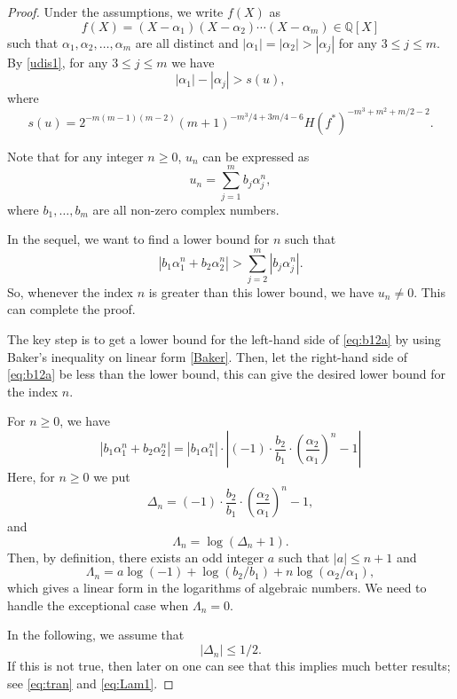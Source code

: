 \documentclass[12pt]{amsart}
\theoremstyle{definition}
\theoremstyle{remark}
\numberwithin{equation}{section}
\begin{document}
\begin{proof}
Under the assumptions, we write $f(X)$ as
$$
f(X)=(X-{\alpha}_1)(X-{\alpha}_2)\cdots (X-{\alpha}_m) \in {{\mathbb Q}}[X]
$$
such that ${\alpha}_1,{\alpha}_2,\ldots,{\alpha}_m$ are all distinct and $|{\alpha}_1|=|{\alpha}_2|>|{\alpha}_j|$ for any $3\le j \le m$. 
By \eqref{udis1}, for any $3\le j \le m$ we have
$$
|{\alpha}_1|-|{\alpha}_j| > s(u),
$$
where
$$
s(u)=2^{-m(m-1)(m-2)}(m+1)^{-m^3/4+3m/4-6}H(f^*)^{-m^3+m^2+m/2-2}.
$$

Note that for any integer $n\ge 0$, $u_n$ can be expressed as
$$
u_n=\sum_{j=1}^{m}b_j\alpha_j^n,
$$
where $b_1,\ldots,b_m$ are all non-zero complex numbers. 

In the sequel, we want to find a lower bound for $n$ such that
\begin{equation}
\label{eq:b12a}
|b_1{\alpha}_1^n+b_2{\alpha}_2^n|> \sum_{j=2}^{m}|b_j\alpha_j^n|.
\end{equation}
So, whenever the index $n$ is greater than this lower bound, we have $u_n \ne 0$. This can complete the proof. 

The key step is to get a lower bound for the left-hand side of \eqref{eq:b12a} by using Baker's inequality on linear form \eqref{Baker}. 
Then, let the right-hand side of \eqref{eq:b12a} be less than the lower bound, this can give the desired lower bound for the index $n$. 

For $n\ge 0$, we have
\begin{equation}
\label{eq:initial}
|b_1{\alpha}_1^n+b_2{\alpha}_2^n|
=|b_1{\alpha}_1^n| \cdot \left|(-1)\cdot \frac{b_2}{b_1}\cdot (\frac{{\alpha}_2}{{\alpha}_1})^n-1 \right| 
\end{equation}
Here, for $n\ge 0$ we put
$$
\Delta_n = (-1)\cdot \frac{b_2}{b_1}\cdot (\frac{{\alpha}_2}{{\alpha}_1})^n-1,
$$
and 
\begin{equation}
\label{eq:LaDe}
\Lambda_n = \log (\Delta_n +1). 
\end{equation}
Then, by definition, there exists an odd integer $a$ such that $|a| \le n+1 $ and 
$$
\Lambda_n = a \log (-1) + \log (b_2/b_1) + n \log ({\alpha}_2/{\alpha}_1), 
$$
which gives a linear form in the logarithms of algebraic numbers. 
We need to handle the exceptional case when $\Lambda_n = 0$.  

In the following, we assume that 
\begin{equation}
\label{eq:1/2}
|\Delta_n| \le 1/2.
\end{equation}
If this is not true, then later on one can see that this implies much better results; see \eqref{eq:tran} and \eqref{eq:Lam1}.


\end{proof}
\end{document}
